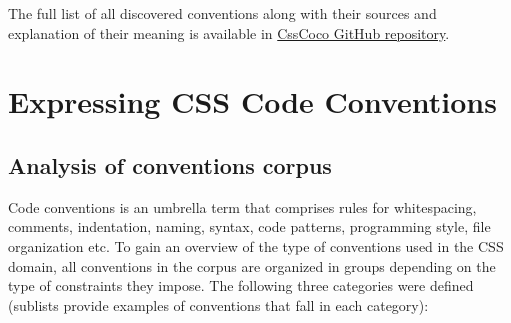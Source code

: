 \documentclass[parskip=full]{uvamscse}
\begin{document}
The full list of all discovered conventions along with their sources and explanation of their meaning is available in \href{https://github.com/boryanagoncharenko/CssCoco/blob/master/analysis.md}{CssCoco GitHub repository}.


\chapter{Expressing CSS Code Conventions}
\label{sec:expressing}

\section{Analysis of conventions corpus}

Code conventions is an umbrella term that comprises rules for whitespacing, comments, indentation,
naming, syntax, code patterns, programming style, file organization etc. To gain an overview of the
type of conventions used in the CSS domain, all conventions in the corpus are organized in groups
depending on the type of constraints they impose. The following three categories were defined
(sublists provide examples of conventions that fall in each category):
\end{document}
